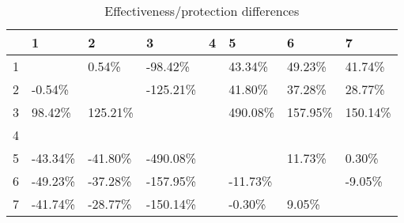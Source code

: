 \begin{table}[ht]
\centering
\begin{tabular}{rlllllll}
  \hline
 & 1 & 2 & 3 & 4 & 5 & 6 & 7 \\ 
  \hline
1 &  & 0.54\% & -98.42\% &  & 43.34\% & 49.23\% & 41.74\% \\ 
  2 & -0.54\% &  & -125.21\% &  & 41.80\% & 37.28\% & 28.77\% \\ 
  3 & 98.42\% & 125.21\% &  &  & 490.08\% & 157.95\% & 150.14\% \\ 
  4 &  &  &  &  &  &  &  \\ 
  5 & -43.34\% & -41.80\% & -490.08\% &  &  & 11.73\% & 0.30\% \\ 
  6 & -49.23\% & -37.28\% & -157.95\% &  & -11.73\% &  & -9.05\% \\ 
  7 & -41.74\% & -28.77\% & -150.14\% &  & -0.30\% & 9.05\% &  \\ 
   \hline
\end{tabular}
\caption{Effectiveness/protection differences} 
\end{table}
